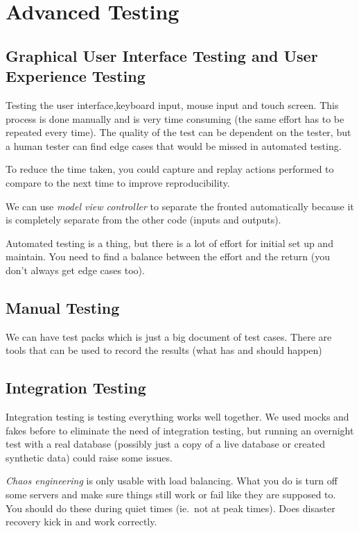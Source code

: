 \section{Advanced Testing}\label{sec:advanced_testing}

\subsection{Graphical User Interface Testing and User Experience Testing}\label{sub:graphical_user_interface_testing_and_user_experience_testing}

Testing the user interface,keyboard input, mouse input and touch screen.
This process is done manually and is very time consuming (the same effort has to be repeated every time).
The quality of the test can be dependent on the tester, but a human tester can find edge cases that would be missed in automated testing.

To reduce the time taken, you could capture and replay actions performed to compare to the next time to improve reproducibility.

We can use \emph{model view controller} to separate the fronted automatically because it is completely separate from the other code (inputs and outputs).

Automated testing is a thing, but there is a lot of effort for initial set up and maintain.
You need to find a balance between the effort and the return (you don't always get edge cases too).

\subsection{Manual Testing}\label{sub:manual_testing}

We can have test packs which is just a big document of test cases.
There are tools that can be used to record the results (what has and should happen)

\subsection{Integration Testing}\label{sub:integration_testing}

Integration testing is testing everything works well together.
We used mocks and fakes before to eliminate the need of integration testing, but running an overnight test with a real database (possibly just a copy of a live database or created synthetic data) could raise some issues.

\emph{Chaos engineering} is only usable with load balancing.
What you do is turn off some servers and make sure things still work or fail like they are supposed to.
You should do these during quiet times (ie.\ not at peak times).
Does disaster recovery kick in and work correctly.

